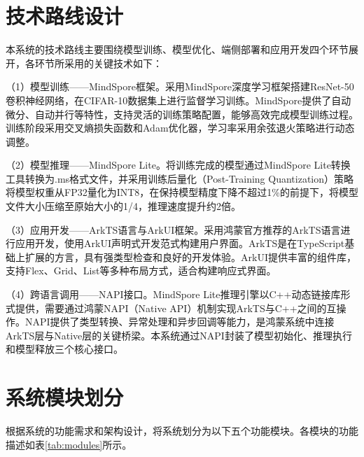 \section{技术路线设计}

本系统的技术路线主要围绕模型训练、模型优化、端侧部署和应用开发四个环节展开，各环节所采用的关键技术如下：

（1）模型训练——MindSpore框架。采用MindSpore深度学习框架搭建ResNet-50卷积神经网络，在CIFAR-10数据集上进行监督学习训练。MindSpore提供了自动微分、自动并行等特性，支持灵活的训练策略配置，能够高效完成模型训练过程。训练阶段采用交叉熵损失函数和Adam优化器，学习率采用余弦退火策略进行动态调整。

（2）模型推理——MindSpore Lite。将训练完成的模型通过MindSpore Lite转换工具转换为.ms格式文件，并采用训练后量化（Post-Training Quantization）策略将模型权重从FP32量化为INT8，在保持模型精度下降不超过1\%的前提下，将模型文件大小压缩至原始大小的1/4，推理速度提升约2倍。

（3）应用开发——ArkTS语言与ArkUI框架。采用鸿蒙官方推荐的ArkTS语言进行应用开发，使用ArkUI声明式开发范式构建用户界面。ArkTS是在TypeScript基础上扩展的方言，具有强类型检查和良好的开发体验。ArkUI提供丰富的组件库，支持Flex、Grid、List等多种布局方式，适合构建响应式界面。

（4）跨语言调用——NAPI接口。MindSpore Lite推理引擎以C++动态链接库形式提供，需要通过鸿蒙NAPI（Native API）机制实现ArkTS与C++之间的互操作。NAPI提供了类型转换、异常处理和异步回调等能力，是鸿蒙系统中连接ArkTS层与Native层的关键桥梁。本系统通过NAPI封装了模型初始化、推理执行和模型释放三个核心接口。

\section{系统模块划分}

根据系统的功能需求和架构设计，将系统划分为以下五个功能模块。各模块的功能描述如表\ref{tab:modules}所示。

